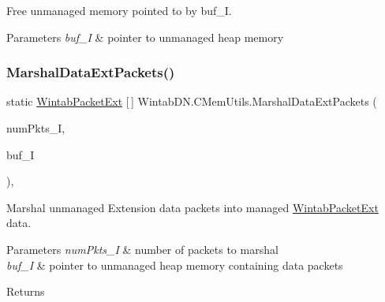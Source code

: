 Free unmanaged memory pointed to by buf\+\_\+I. 


\begin{DoxyParams}{Parameters}
{\em buf\+\_\+I} & pointer to unmanaged heap memory\\
\hline
\end{DoxyParams}
\mbox{\label{class_wintab_d_n_1_1_c_mem_utils_a62d347b8878e39416a10a9858ebef9d4}} 
\subsubsection{\texorpdfstring{Marshal\+Data\+Ext\+Packets()}{MarshalDataExtPackets()}}
{\footnotesize\ttfamily static \mbox{\hyperlink{struct_wintab_d_n_1_1_wintab_packet_ext}{Wintab\+Packet\+Ext}} \mbox{[}$\,$\mbox{]} Wintab\+D\+N.\+C\+Mem\+Utils.\+Marshal\+Data\+Ext\+Packets (\begin{DoxyParamCaption}\item[{U\+Int32}]{num\+Pkts\+\_\+I,  }\item[{Int\+Ptr}]{buf\+\_\+I }\end{DoxyParamCaption})\hspace{0.3cm}{\ttfamily [inline]}, {\ttfamily [static]}}



Marshal unmanaged Extension data packets into managed \mbox{\hyperlink{struct_wintab_d_n_1_1_wintab_packet_ext}{Wintab\+Packet\+Ext}} data. 


\begin{DoxyParams}{Parameters}
{\em num\+Pkts\+\_\+I} & number of packets to marshal\\
\hline
{\em buf\+\_\+I} & pointer to unmanaged heap memory containing data packets\\
\hline
\end{DoxyParams}
\begin{DoxyReturn}{Returns}

\end{DoxyReturn}
\mbox{\label{class_wintab_d_n_1_1_c_mem_utils_aca1dfda3c26d87d8ab83fa2a2c880c6a}} 
